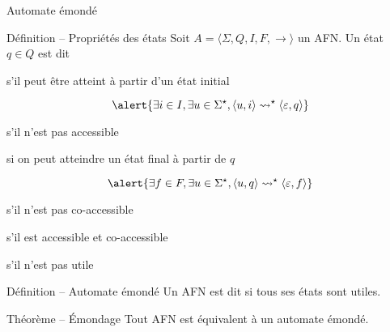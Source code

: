 
\begingroup

\begin{frame}{Automate émondé}

  \vspace{-2mm}
  \begin{block}{Définition -- Propriétés des états}
    Soit $A=\langle \Sigma, Q, I, F, \rightarrow \rangle$ un AFN. Un état $q \in Q$ est dit
    \begin{description}[co-accessible]
    \item[accessible] s'il peut être atteint à partir d'un état initial

      \vspace{-3mm}
      $$\alert{\exists i\in I, \exists u\in \Sigma^\star, \langle u, i\rangle \leadsto^\star \langle \varepsilon, q\rangle}$$
      \vspace{-6mm}

    \item[inaccessible] s'il n'est pas accessible
    \item[co-accessible] si on peut atteindre un état final à partir de $q$

      \vspace{-3mm}
      $$\alert{\exists f\in F, \exists u\in \Sigma^\star, \langle u, q\rangle \leadsto^\star \langle \varepsilon, f\rangle}$$
      \vspace{-6mm}

    \item[stérile] s'il n'est pas co-accessible
    \item[utile] s'il est accessible et co-accessible
    \item[inutile] s'il n'est pas utile
    \end{description}
  \end{block}
  
  \begin{block}{Définition -- Automate émondé}
    Un AFN est dit  si tous ses états sont utiles. 
  \end{block}

  \begin{block}{Théorème -- Émondage}
    Tout AFN est équivalent à un automate émondé.
  \end{block}

\end{frame}


\endgroup
